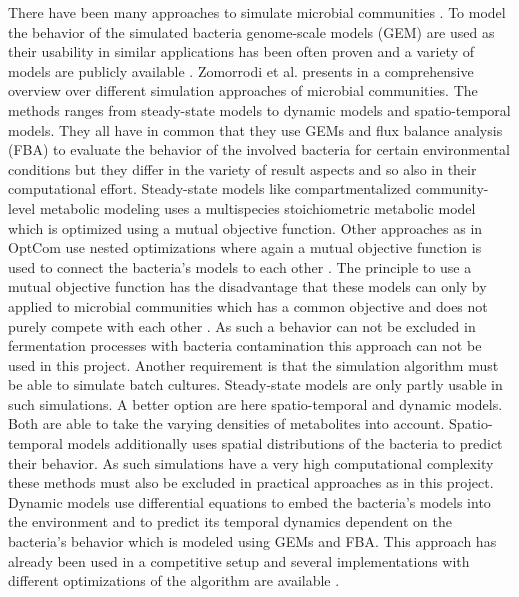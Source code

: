 There have been many approaches to simulate microbial communities \cite{ZOMORRODI2016837}. To model the behavior of the simulated bacteria
genome-scale models (GEM) are used as their usability in similar applications has been often proven and a variety of models are publicly
available \cite{6915830}.
Zomorrodi et al. presents in \cite{ZOMORRODI2016837} a comprehensive overview over different simulation approaches of microbial communities.
The methods ranges from steady-state models to dynamic models and spatio-temporal models. They all have in common that they use GEMs and
flux balance analysis (FBA) to evaluate the behavior of the involved bacteria for certain environmental conditions but they differ in the
variety of result aspects and so also in their computational effort.
Steady-state models like compartmentalized community-level metabolic modeling uses a multispecies stoichiometric metabolic model
\cite{Stolyar92} which is optimized using a mutual objective function. Other approaches as in OptCom use nested optimizations where again
a mutual objective function is used to connect the bacteria's models to each other \cite{zomorrodi2012optcom}. The principle to use a mutual
objective function has the disadvantage that these models can only by applied to microbial communities which has a common objective and does
not purely compete with each other \cite{ZOMORRODI2016837}. As such a behavior can not be excluded in fermentation processes with bacteria
contamination this approach can not be used in this project.
Another requirement is that the simulation algorithm must be able to simulate batch cultures. Steady-state models are only partly usable in
such simulations. A better option are here spatio-temporal and dynamic models. Both are able to take the varying densities of metabolites
into account. Spatio-temporal models additionally uses spatial distributions of the bacteria to predict their behavior. As such simulations
have a very high computational complexity\cite{ZOMORRODI2016837} these methods must also be excluded in practical approaches as in this project.
Dynamic models use differential equations to embed the bacteria's models into the environment and to predict its temporal dynamics
dependent on the bacteria's behavior which is modeled using GEMs and FBA. This approach has already been used in a competitive setup \cite{zhuang2011genome}
and several implementations with different optimizations of the algorithm are available \cite{6915830}.





